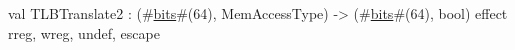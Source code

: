 val TLBTranslate2 : (#\hyperref[zbits]{bits}#(64), MemAccessType) -> (#\hyperref[zbits]{bits}#(64), bool) effect {rreg, wreg, undef, escape}
